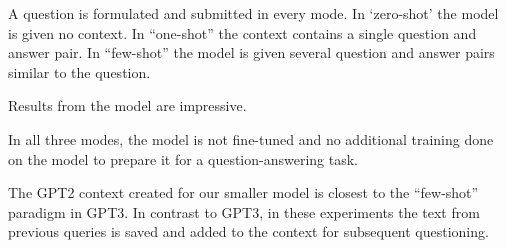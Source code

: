 A question is formulated and submitted in every mode. In `zero-shot' the model is given no  context. In ``one-shot'' the context contains a single question and answer pair. In ``few-shot'' the model is given several question and answer pairs similar to the question.

Results from the model are impressive. 

In all three modes, the model is not fine-tuned and no additional training done on the model to prepare it for a question-answering task.

The GPT2 context created for our smaller model is closest to the ``few-shot'' paradigm in GPT3. In contrast to GPT3, in these experiments the text from previous queries is saved and added to the context for subsequent questioning.

